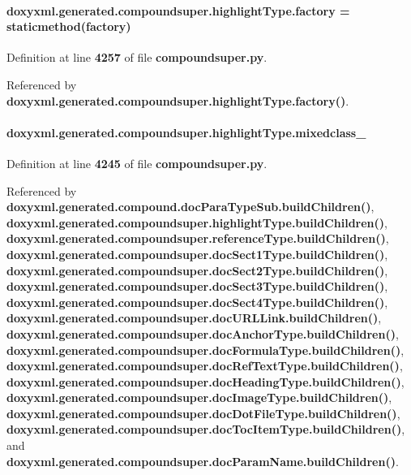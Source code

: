\paragraph[{factory}]{\setlength{\rightskip}{0pt plus 5cm}doxyxml.\+generated.\+compoundsuper.\+highlight\+Type.\+factory = staticmethod(factory)\hspace{0.3cm}{\ttfamily [static]}}\label{classdoxyxml_1_1generated_1_1compoundsuper_1_1highlightType_a1fda342d10bfa3ed59f7f07b1a6237fc}


Definition at line {\bf 4257} of file {\bf compoundsuper.\+py}.



Referenced by {\bf doxyxml.\+generated.\+compoundsuper.\+highlight\+Type.\+factory()}.

\paragraph[{mixedclass\+\_\+}]{\setlength{\rightskip}{0pt plus 5cm}doxyxml.\+generated.\+compoundsuper.\+highlight\+Type.\+mixedclass\+\_\+}\label{classdoxyxml_1_1generated_1_1compoundsuper_1_1highlightType_a8f6d28b84f569365f8d68550282aac4b}


Definition at line {\bf 4245} of file {\bf compoundsuper.\+py}.



Referenced by {\bf doxyxml.\+generated.\+compound.\+doc\+Para\+Type\+Sub.\+build\+Children()}, {\bf doxyxml.\+generated.\+compoundsuper.\+highlight\+Type.\+build\+Children()}, {\bf doxyxml.\+generated.\+compoundsuper.\+reference\+Type.\+build\+Children()}, {\bf doxyxml.\+generated.\+compoundsuper.\+doc\+Sect1\+Type.\+build\+Children()}, {\bf doxyxml.\+generated.\+compoundsuper.\+doc\+Sect2\+Type.\+build\+Children()}, {\bf doxyxml.\+generated.\+compoundsuper.\+doc\+Sect3\+Type.\+build\+Children()}, {\bf doxyxml.\+generated.\+compoundsuper.\+doc\+Sect4\+Type.\+build\+Children()}, {\bf doxyxml.\+generated.\+compoundsuper.\+doc\+U\+R\+L\+Link.\+build\+Children()}, {\bf doxyxml.\+generated.\+compoundsuper.\+doc\+Anchor\+Type.\+build\+Children()}, {\bf doxyxml.\+generated.\+compoundsuper.\+doc\+Formula\+Type.\+build\+Children()}, {\bf doxyxml.\+generated.\+compoundsuper.\+doc\+Ref\+Text\+Type.\+build\+Children()}, {\bf doxyxml.\+generated.\+compoundsuper.\+doc\+Heading\+Type.\+build\+Children()}, {\bf doxyxml.\+generated.\+compoundsuper.\+doc\+Image\+Type.\+build\+Children()}, {\bf doxyxml.\+generated.\+compoundsuper.\+doc\+Dot\+File\+Type.\+build\+Children()}, {\bf doxyxml.\+generated.\+compoundsuper.\+doc\+Toc\+Item\+Type.\+build\+Children()}, and {\bf doxyxml.\+generated.\+compoundsuper.\+doc\+Param\+Name.\+build\+Children()}.

